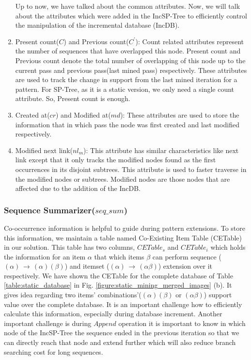 \begin{enumerate}
Up to now, we have talked about the common attributes. Now, we will talk about the attributes which were added in the IncSP-Tree to efficiently control the manipulation of the incremental database (IncDB).
        \item Present count($C$) and Previous count($C^{\prime}$): Count related attributes represent the number of sequences that have overlapped this node. Present count and Previous count denote the total number of overlapping of this node up to the current pass and previous pass(last mined pass) respectively. These attributes are used to track the change in support from the last mined iteration for a pattern. For SP-Tree, as it is a static version, we only need a single count attribute. So, Present count is enough.
        \item Created at($cr$) and Modified at($md$): These attributes are used to store the information that in which pass the node was first created and last modified respectively.
        \item Modified next link($nl_{m}$): This attribute has similar characteristics like next link except that it only tracks the modified nodes found as the first occurrences in its disjoint subtrees. This attribute is used to faster traverse in the modified nodes or subtrees. Modified nodes are those nodes that are affected due to the addition of the IncDB.
       \end{enumerate}

\subsubsection{Sequence Summarizer($seq\_sum$)}
Co-occurrence information \cite{fournier2014fast,fournier2017survey} is helpful to guide during pattern extensions. To store this information, we maintain a table named Co-Existing Item Table (CETable) in our solution. This table has two columns, $CETable_{s}$ and $CETable_{i}$ which holds the information for an item $\alpha$ that which items $\beta$ can perform sequence ($(\alpha) \,\to\, (\alpha)(\beta)$) and itemset ($(\alpha) \,\to\, (\alpha\beta)$) extension over it respectively. We have shown the CETable for the complete database of Table \ref{table:static_database} in Fig. \ref{figure:static_mining_merged_images} (b). It gives idea regarding two items' combinations'($(\alpha)(\beta) \text{ or } (\alpha\beta)$) support value over the complete database. It is an important challenge how to efficiently calculate this information, especially during database increment. Another important challenge is during $Append$ operation it is important to know in which node of the IncSP-Tree the sequence ended in the previous iteration so that we can directly reach that node and extend further which will also reduce branch searching cost for long sequences. 

